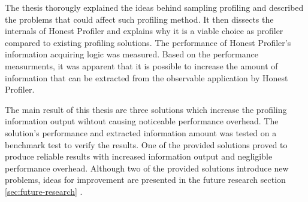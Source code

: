 \documentclass[..thesis.tex]{subfiles}
\begin{document}
The thesis thorougly explained the ideas behind sampling profiling and described the problems that could affect such profiling method. It then dissects the internals of Honest Profiler and explains why it is a viable choice  as profiler compared to  existing profiling solutions. The performance of Honest Profiler's information acquiring logic was measured. Based on the performance measurments, it was apparent that it is possible  to increase the amount of information that can be extracted from the observable application by Honest Profiler.

The main result of this thesis are three solutions which increase the profiling information output wihtout causing noticeable performance overhead. The solution's performance and extracted information amount was tested on a benchmark test to verify the results. One of the provided solutions proved to produce reliable results with increased information output and negligible performance overhead. Although two of the provided solutions introduce new problems, ideas for improvement are presented in the future research section \ref{sec:future-research} .

\end{document}
